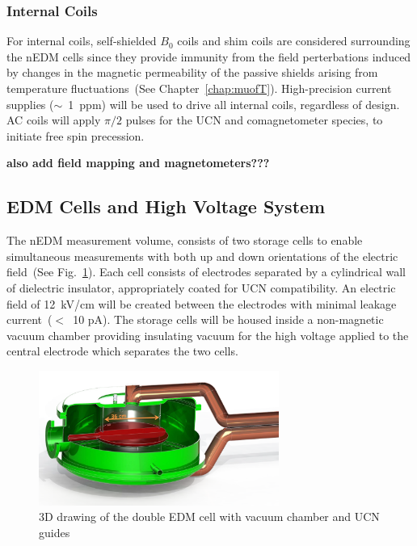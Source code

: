 \subsubsection{Internal Coils}
For internal coils, self-shielded $B_0$ coils and shim coils are
considered surrounding the nEDM cells since they provide immunity from
the field perterbations induced by changes in the magnetic
permeability of the passive shields arising from temperature
fluctuations~(See Chapter~\ref{chap:muofT}).  High-precision current
supplies ($\sim$~1~ppm) will be used to drive all internal coils,
regardless of design. AC coils will apply $\pi/2$ pulses for the UCN and
comagnetometer species, to initiate free spin precession.

\textbf{also add field mapping and magnetometers???}




\subsection{ EDM Cells and High Voltage System}
The nEDM measurement volume, consists of two storage cells to enable
simultaneous measurements with both up and down orientations of the
electric field~(See Fig.~\ref{fig:HVcell}). Each cell consists of
electrodes separated by a cylindrical wall of dielectric insulator,
appropriately coated for UCN compatibility. An electric field of
12~kV/cm will be created between the electrodes with minimal leakage
current~($<$~10 pA).  The storage cells will be housed inside a
non-magnetic vacuum chamber providing insulating vacuum for the high
voltage applied to the central electrode which separates the two
cells.

\begin{figure}[h!]
  \centering
  \includegraphics[width=0.7\textwidth]{HVcell.png}
  \caption{3D drawing of the double EDM cell with vacuum chamber and
    UCN guides}
  \label{fig:HVcell}
\end{figure}



